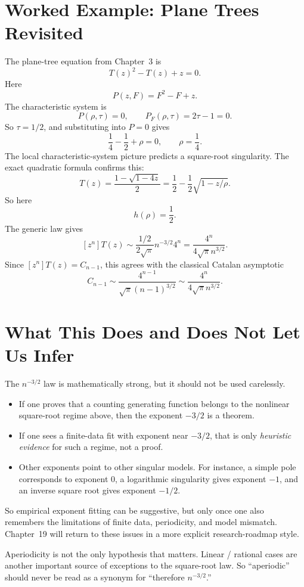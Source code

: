 \section{Worked Example: Plane Trees Revisited}

The plane-tree equation from Chapter~3 is
\[
  T(z)^2 - T(z) + z = 0.
\]
Here
\[
  P(z,F) = F^2 - F + z.
\]
The characteristic system is
\[
  P(\rho,\tau)=0,
  \qquad
  P_F(\rho,\tau)=2\tau-1=0.
\]
So $\tau = 1/2$, and substituting into $P=0$ gives
\[
  \frac{1}{4} - \frac{1}{2} + \rho = 0,
  \qquad
  \rho = \frac{1}{4}.
\]
The local characteristic-system picture predicts a square-root singularity. The exact quadratic formula confirms this:
\[
  T(z) = \frac{1-\sqrt{1-4z}}{2} = \frac{1}{2} - \frac{1}{2}\sqrt{1-z/\rho}.
\]
So here
\[
  h(\rho) = \frac{1}{2}.
\]
The generic law gives
\[
  [z^n]T(z)
  \sim \frac{1/2}{2\sqrt{\pi}} n^{-3/2}4^n
  = \frac{4^n}{4\sqrt{\pi}n^{3/2}}.
\]
Since $[z^n]T(z) = C_{n-1}$, this agrees with the classical Catalan asymptotic
\[
  C_{n-1} \sim \frac{4^{n-1}}{\sqrt{\pi}(n-1)^{3/2}} \sim \frac{4^n}{4\sqrt{\pi}n^{3/2}}.
\]

\section{What This Does and Does Not Let Us Infer}

The $n^{-3/2}$ law is mathematically strong, but it should not be used carelessly.

\begin{itemize}
  \item If one proves that a counting generating function belongs to the nonlinear square-root regime above, then the exponent $-3/2$ is a theorem.
  \item If one sees a finite-data fit with exponent near $-3/2$, that is only \emph{heuristic evidence} for such a regime, not a proof.
  \item Other exponents point to other singular models. For instance, a simple pole corresponds to exponent $0$, a logarithmic singularity gives exponent $-1$, and an inverse square root gives exponent $-1/2$.
\end{itemize}

So empirical exponent fitting can be suggestive, but only once one also remembers the limitations of finite data, periodicity, and model mismatch. Chapter~19 will return to these issues in a more explicit research-roadmap style.

\begin{remark}
Aperiodicity is not the only hypothesis that matters. Linear / rational cases are another important source of exceptions to the square-root law. So ``aperiodic'' should never be read as a synonym for ``therefore $n^{-3/2}$.''
\end{remark}

